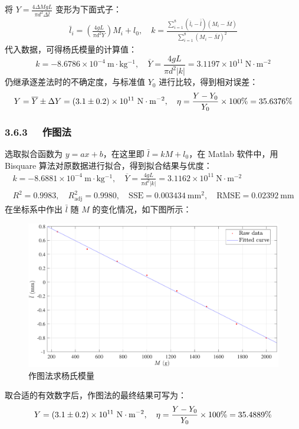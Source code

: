 \documentclass[UTF8]{article}
\theoremstyle{MyLineTheoremStyle} %
\theoremstyle{MyBlockTheoremStyle} %
\theoremstyle{MySubsubsectionStyle} %
\begin{document}
将 $Y = \frac{4\Delta MgL}{\pi d^{2}\Delta\bar{l}}$ 变形为下面式子：
\begin{gather}
\bar{l}_i = \left(\frac{4gL}{\pi d^2 Y}\right) M_i + l_0,\quad 
k = \frac{\sum_{i=1}^{8} \left( \bar{l}_i - \bar{\bar{l}}\right) \left(M_i - \overline{M}\right) }{ \sum_{i=1}^{8}\left(M_i - \overline{M}\right)^2 }
\end{gather}
代入数据，可得杨氏模量的计算值：
\begin{equation}
k = -8.6786 \times 10^{-4} \ \mathrm{m\cdot kg^{-1}} ,\quad  \overline{Y} = \frac{4gL}{\pi d^2 | k |} = 3.1197 \times 10^{11} \ \mathrm{N\cdot m^{-2}}
\end{equation}
仍继承逐差法时的不确定度，与标准值 $Y_0$ 进行比较，得到相对误差：
\begin{equation}\boldmath
    Y = \overline{Y} \pm \Delta Y = (3.1 \pm 0.2) \times 10^{11} \ \mathrm{N\cdot m^{-2}}
    ,\quad
    \eta = \frac{Y - Y_0}{Y_0} \times 100\% = 35.6376\%
\end{equation}

\subsubsection*{3.6.3 \ \ 作图法}

选取拟合函数为 $y = ax + b$，在这里即 $\bar{l} = kM + l_0$，在 Matlab 软件中，用 Bisquare 算法对原数据进行拟合，得到拟合结果与优度：
\begin{gather}
k = - 8.6881 \times 10^{-4} \ \mathrm{m\cdot kg^{-1}},\quad 
\overline{Y} = \frac{4gL}{\pi d^2 | k |} = 3.1162 \times 10^{11} \ \mathrm{N\cdot m^{-2}}
\\ 
R^2 = 0.9983,\quad R^2_{\text{adj}} = 0.9980 ,\quad  \text{SSE} = 0.003434 \ \mathrm{mm^2} ,\quad \text{RMSE} = 0.02392 \ \mathrm{mm}
\end{gather}
在坐标系中作出 $\bar{l}$ 随 $M$ 的变化情况，如下图所示：
\begin{figure}[H]\centering
    \includegraphics[width=0.9\columnwidth]{assets/1 悬挂/2024-11-12_21-13-51.pdf}
    \caption{作图法求杨氏模量}
\end{figure}
取合适的有效数字后，作图法的最终结果可写为：
\begin{equation}\boldmath
Y = (3.1 \pm 0.2) \times 10^{11} \ \mathrm{N\cdot m^{-2}},\quad 
\eta = \frac{Y - Y_0}{Y_0} \times 100\% = 35.4889\%
\end{equation}
\end{document}
